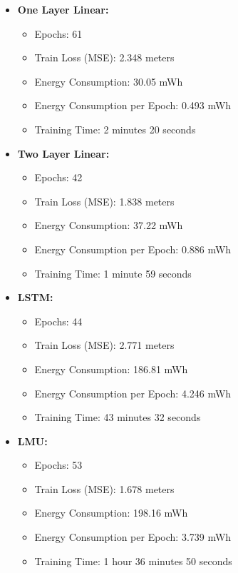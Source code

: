 \begin{itemize}
    \item \textbf{One Layer Linear:} 
    \begin{itemize}
        \item Epochs: 61
        \item Train Loss (MSE): 2.348 meters
        \item Energy Consumption: 30.05 mWh
        \item Energy Consumption per Epoch: 0.493 mWh
        \item Training Time: 2 minutes 20 seconds
    \end{itemize}
    
    \item \textbf{Two Layer Linear:} 
    \begin{itemize}
        \item Epochs: 42
        \item Train Loss (MSE): 1.838 meters
        \item Energy Consumption: 37.22 mWh
        \item Energy Consumption per Epoch: 0.886 mWh
        \item Training Time: 1 minute 59 seconds
    \end{itemize}
    
    \item \textbf{LSTM:} 
    \begin{itemize}
        \item Epochs: 44
        \item Train Loss (MSE): 2.771 meters
        \item Energy Consumption: 186.81 mWh
        \item Energy Consumption per Epoch: 4.246 mWh
        \item Training Time: 43 minutes 32 seconds
    \end{itemize}
    
    \item \textbf{LMU:} 
    \begin{itemize}
        \item Epochs: 53
        \item Train Loss (MSE): 1.678 meters
        \item Energy Consumption: 198.16 mWh
        \item Energy Consumption per Epoch: 3.739 mWh
        \item Training Time: 1 hour 36 minutes 50 seconds
    \end{itemize}
    

\end{itemize}
